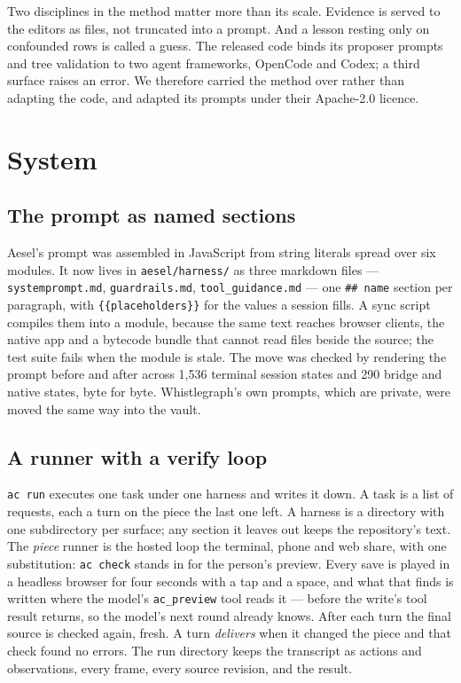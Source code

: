 \documentclass[10pt,letterpaper,twocolumn]{article}
\newcommand{\code}[1]{\texttt{#1}}
\begin{document}
Two disciplines in the method matter more than its scale. Evidence is served to
the editors as files, not truncated into a prompt. And a lesson resting only on
confounded rows is called a guess. The released code binds its proposer
prompts and tree validation to two agent frameworks, OpenCode and Codex; a third
surface raises an error. We therefore carried the method over rather than
adapting the code, and adapted its prompts under their Apache-2.0 licence.

\section{System}
\label{sec:system}

\subsection{The prompt as named sections}
Aesel's prompt was assembled in JavaScript from string literals spread over
six modules. It now lives in \code{aesel/harness/} as three markdown files ---
\code{systemprompt.md}, \code{guardrails.md}, \code{tool\_guidance.md} --- one
\code{\#\# name} section per paragraph, with \code{\{\{placeholders\}\}} for the
values a session fills. A sync script compiles them into a module, because the
same text reaches browser clients, the native app and a bytecode bundle that
cannot read files beside the source; the test suite fails when the module is
stale. The move was checked by rendering the prompt before and after across
1,536 terminal session states and 290 bridge and native states, byte for byte.
Whistlegraph's own prompts, which are private, were moved the same way into the
vault.

\subsection{A runner with a verify loop}
\code{ac run} executes one task under one harness and writes it down. A task
is a list of requests, each a turn on the piece the last one left. A harness is
a directory with one subdirectory per surface; any section it leaves out keeps
the repository's text. The \emph{piece} runner is the hosted loop the terminal,
phone and web share, with one substitution: \code{ac check} stands in for the
person's preview. Every save is played in a headless browser for four seconds
with a tap and a space, and what that finds is written where the model's
\code{ac\_preview} tool reads it --- before the write's tool result returns, so
the model's next round already knows. After each turn the final source is
checked again, fresh. A turn \emph{delivers} when it changed the piece and that
check found no errors. The run directory keeps the transcript as actions and
observations, every frame, every source revision, and the result.
\end{document}
